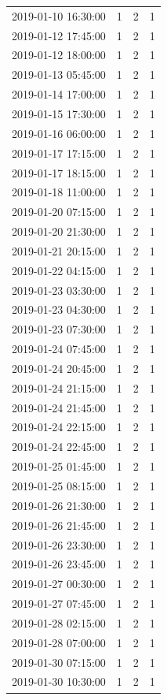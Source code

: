 \begin{tabular}{lrrr}
2019-01-10 16:30:00 & 1 & 2 & 1 \\
2019-01-12 17:45:00 & 1 & 2 & 1 \\
2019-01-12 18:00:00 & 1 & 2 & 1 \\
2019-01-13 05:45:00 & 1 & 2 & 1 \\
2019-01-14 17:00:00 & 1 & 2 & 1 \\
2019-01-15 17:30:00 & 1 & 2 & 1 \\
2019-01-16 06:00:00 & 1 & 2 & 1 \\
2019-01-17 17:15:00 & 1 & 2 & 1 \\
2019-01-17 18:15:00 & 1 & 2 & 1 \\
2019-01-18 11:00:00 & 1 & 2 & 1 \\
2019-01-20 07:15:00 & 1 & 2 & 1 \\
2019-01-20 21:30:00 & 1 & 2 & 1 \\
2019-01-21 20:15:00 & 1 & 2 & 1 \\
2019-01-22 04:15:00 & 1 & 2 & 1 \\
2019-01-23 03:30:00 & 1 & 2 & 1 \\
2019-01-23 04:30:00 & 1 & 2 & 1 \\
2019-01-23 07:30:00 & 1 & 2 & 1 \\
2019-01-24 07:45:00 & 1 & 2 & 1 \\
2019-01-24 20:45:00 & 1 & 2 & 1 \\
2019-01-24 21:15:00 & 1 & 2 & 1 \\
2019-01-24 21:45:00 & 1 & 2 & 1 \\
2019-01-24 22:15:00 & 1 & 2 & 1 \\
2019-01-24 22:45:00 & 1 & 2 & 1 \\
2019-01-25 01:45:00 & 1 & 2 & 1 \\
2019-01-25 08:15:00 & 1 & 2 & 1 \\
2019-01-26 21:30:00 & 1 & 2 & 1 \\
2019-01-26 21:45:00 & 1 & 2 & 1 \\
2019-01-26 23:30:00 & 1 & 2 & 1 \\
2019-01-26 23:45:00 & 1 & 2 & 1 \\
2019-01-27 00:30:00 & 1 & 2 & 1 \\
2019-01-27 07:45:00 & 1 & 2 & 1 \\
2019-01-28 02:15:00 & 1 & 2 & 1 \\
2019-01-28 07:00:00 & 1 & 2 & 1 \\
2019-01-30 07:15:00 & 1 & 2 & 1 \\
2019-01-30 10:30:00 & 1 & 2 & 1 \\

\end{tabular}
